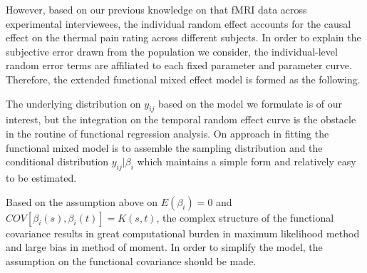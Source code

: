 However, based on our previous knowledge on that fMRI data across experimental interviewees, the individual random effect accounts for the causal effect on the thermal pain rating across different subjects. In order to explain the subjective error drawn from the population we consider, the individual-level random error terms are affiliated to each fixed parameter and parameter curve. 
Therefore, the extended functional mixed effect model is formed as the following.


The underlying distribution on $y_{ij}$ based on the model we formulate is of our interest, but the integration on the temporal random effect curve is the obstacle in the routine of functional regression analysis. On approach in fitting the functional mixed model is to assemble the sampling distribution and the conditional distribution $y_{ij}|\beta_i$ which maintains a simple form and relatively easy to be estimated.  

Based on the assumption above on $E(\beta_i) = 0$ and $COV[\beta_i(s), \beta_i(t)] = K(s, t)$, the complex structure of the functional covariance results in great computational burden in maximum likelihood method and large bias in method of moment. In order to simplify the model, the assumption on the functional covariance should be made.

